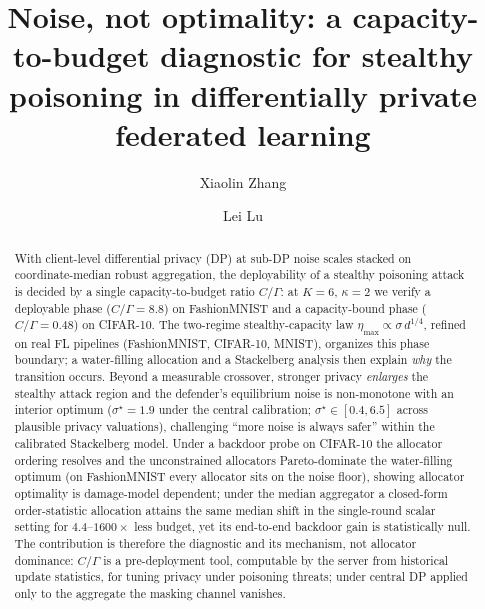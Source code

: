 \documentclass[final,1p,times]{elsarticle}
\begin{document}
\begin{frontmatter}
\title{Noise, not optimality: a capacity-to-budget diagnostic for
stealthy poisoning in differentially private federated learning}

\author[aqnu_cs]{Xiaolin Zhang}
\author[aqnu_sp]{Lei Lu}

\begin{abstract}
With client-level differential privacy (DP) at sub-DP noise scales
stacked on coordinate-median
robust aggregation, the deployability of a stealthy poisoning attack is
decided by a single capacity-to-budget ratio $C/\Gamma$: at $K{=}6$,
$\kappa{=}2$ we verify a
deployable phase ($C/\Gamma{=}8.8$) on FashionMNIST and a capacity-bound
phase ($C/\Gamma{=}0.48$) on CIFAR-10. The two-regime stealthy-capacity
law $\eta_{\max}\propto\sigma\, d^{1/4}$, refined on real FL pipelines
(FashionMNIST, CIFAR-10, MNIST), organizes this phase boundary; a
water-filling allocation and a Stackelberg analysis then explain
\emph{why} the transition occurs. Beyond a measurable crossover, stronger
privacy \emph{enlarges} the stealthy attack region and the defender's
equilibrium noise is non-monotone with an interior optimum
($\sigma^\star{=}1.9$ under the central calibration; $\sigma^\star\in[0.4,6.5]$
across plausible privacy valuations), challenging ``more noise is always
safer'' within the calibrated Stackelberg model. Under a backdoor probe
on CIFAR-10 the allocator ordering resolves and the unconstrained
allocators Pareto-dominate the water-filling optimum (on FashionMNIST
every allocator sits on the noise floor), showing allocator optimality
is damage-model dependent; under the median aggregator a closed-form
order-statistic allocation attains the same median shift in the
single-round scalar setting for $4.4$--$1600\times$ less budget, yet its
end-to-end backdoor gain is statistically null. The contribution is
therefore the diagnostic and its mechanism, not allocator dominance:
$C/\Gamma$ is a pre-deployment tool, computable by the server from
historical update statistics, for tuning privacy under poisoning
threats; under central DP applied only to the aggregate the masking
channel vanishes.
\end{abstract}


\end{frontmatter}
\end{document}
